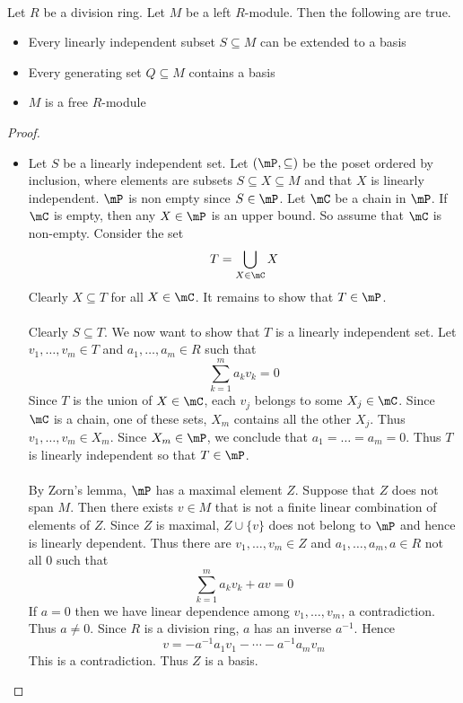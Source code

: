 \documentclass[a4paper]{article}
\begin{document}
\begin{prp}{}{}\\
Let $R$ be a division ring. Let $M$ be a left $R$-module. Then the following are true. 
\begin{itemize}
\item Every linearly independent subset $S\subseteq M$ can be extended to a basis
\item Every generating set $Q\subseteq M$ contains a basis
\item $M$ is a free $R$-module
\end{itemize} 
\begin{proof}~\\
\begin{itemize}
\item Let $S$ be a linearly independent set. Let $(\mP,\subseteq)$ be the poset ordered by inclusion, where elements are subsets $S\subseteq X\subseteq M$ and that $X$ is linearly independent. $\mP$ is non empty since $S\in\mP$. Let $\mC$ be a chain in $\mP$. If $\mC$ is empty, then any $X\in\mP$ is an upper bound. So assume that $\mC$ is non-empty. Consider the set $$T=\bigcup_{X\in\mC}X$$ Clearly $X\subseteq T$ for all $X\in\mC$. It remains to show that $T\in\mP$. \\~\\

Clearly $S\subseteq T$. We now want to show that $T$ is a linearly independent set. Let $v_1,\dots,v_m\in T$ and $a_1,\dots,a_m\in R$ such that $$\sum_{k=1}^ma_kv_k=0$$ Since $T$ is the union of $X\in\mC$, each $v_j$ belongs to some $X_j\in\mC$. Since $\mC$ is a chain, one of these sets, $X_m$ contains all the other $X_j$. Thus $v_1,\dots,v_m\in X_m$. Since $X_m\in\mP$, we conclude that $a_1=\dots=a_m=0$. Thus $T$ is linearly independent so that $T\in\mP$. \\~\\

By Zorn's lemma, $\mP$ has a maximal element $Z$. Suppose that $Z$ does not span $M$. Then there exists $v\in M$ that is not a finite linear combination of elements of $Z$. Since $Z$ is maximal, $Z\cup\{v\}$ does not belong to $\mP$ and hence is linearly dependent. Thus there are $v_1,\dots,v_m\in Z$ and $a_1,\dots,a_m,a\in R$ not all $0$ such that $$\sum_{k=1}^ma_kv_k+av=0$$ If $a=0$ then we have linear dependence among $v_1,\dots,v_m$, a contradiction. Thus $a\neq 0$. Since $R$ is a division ring, $a$ has an inverse $a^{-1}$. Hence $$v=-a^{-1}a_1v_1-\cdots-a^{-1}a_mv_m$$ This is a contradiction. Thus $Z$ is a basis. 


\end{itemize}
\end{proof}
\end{prp}
\end{document}
